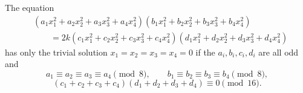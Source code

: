 \begin{proposition}
    The equation
\[
    \begin{aligned}&(a_1x_1^2+a_2x_2^2+a_3x_3^2+a_4x_4^2)(b_1x_1^2+b_2x_2^2+b_3x_3^2+b_4x_4^2)\\&\qquad=2k(c_1x_1^2+c_2x_2^2+c_3x_3^2+c_4x_4^2)(d_1x_1^2+d_2x_2^2+d_3x_3^2+d_4x_4^2)\end{aligned}
\]
    has only the trivial solution $x_1=x_2=x_3=x_4=0$ if the $a_i,b_i,c_i,d_i$ are all odd and
\[
    a_1\equiv a_2\equiv a_3\equiv a_4\pmod8,\qquad b_1\equiv b_2\equiv b_3\equiv b_4\pmod8,
\]
\[
    (c_1+c_2+c_3+c_4)(d_1+d_2+d_3+d_4)\equiv0\pmod{16}.
\]
\end{proposition}
